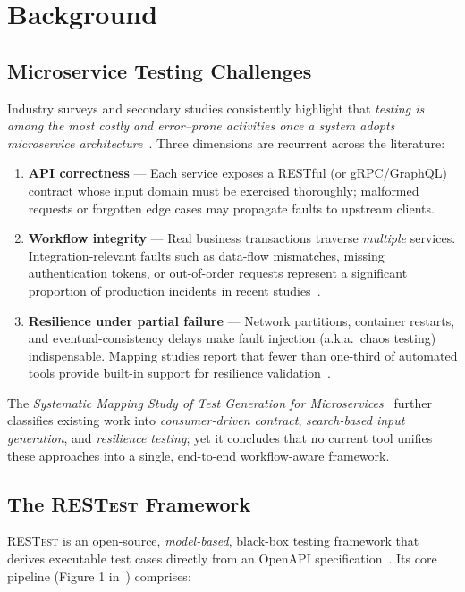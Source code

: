 \section{Background}
\subsection{Microservice Testing Challenges}\label{sec:bg-challenges}
Industry surveys and secondary studies consistently highlight that
\emph{testing is among the most costly and error–prone activities once
a system adopts microservice architecture}~\cite{waseem2020testing, miao2025sms}.  
Three dimensions are recurrent across the literature:

\begin{enumerate}[leftmargin=*,label=\roman*)]
  \item \textbf{API correctness} — Each service exposes a RESTful (or
        gRPC/GraphQL) contract whose input domain must be exercised
        thoroughly; malformed requests or forgotten edge cases may
        propagate faults to upstream clients.
  \item \textbf{Workflow integrity} — Real business transactions
        traverse \emph{multiple} services.  
        Integration‐relevant faults such as data-flow mismatches,
        missing authentication tokens, or out-of-order requests represent
        a significant proportion of production incidents in recent
        studies~\cite{zhou2018microservice}.
  \item \textbf{Resilience under partial failure} — Network partitions,
        container restarts, and eventual-consistency delays make fault
        injection (a.k.a.\ chaos testing) indispensable.  Mapping
        studies report that fewer than one-third of automated tools
        provide built-in support for resilience
        validation~\cite{li2020testing}.
\end{enumerate}

The \emph{Systematic Mapping Study of Test Generation for
Microservices}~\cite{miao2025sms} further classifies existing work
into \textit{consumer-driven contract}, \textit{search-based input
generation}, and \textit{resilience testing}; yet it concludes that
no current tool unifies these approaches into a single, end-to-end
workflow-aware framework.

\subsection{The \textsc{RESTest} Framework}\label{sec:restest}
\textsc{RESTest} is an open-source, \emph{model-based}, black-box
testing framework that derives executable test cases directly from an
OpenAPI specification~\cite{martin2019restest}.  
Its core pipeline (Figure 1 in~\cite{martin2019restest}) comprises:

